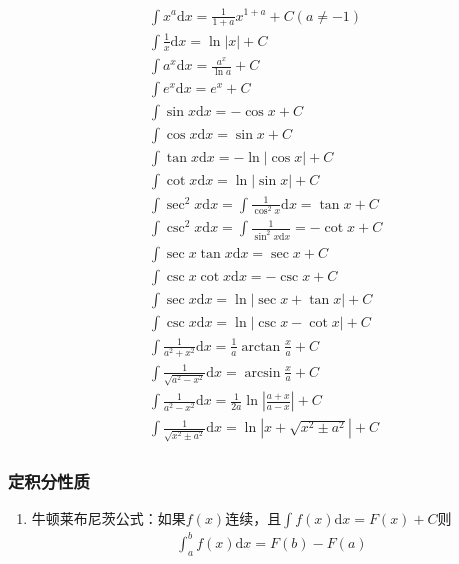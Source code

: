 \documentclass[12pt]{book}
\begin{document}
\begin{gather*}
    \begin{aligned}
        & \int x^{a}\mathrm{d}x =\frac{1}{1+a}x^{1+a}+C (a\neq -1)  \\
        & \int{ \frac{1}{x} \mathrm{d}x} = \ln{|x|} +C \\
        & \int{a^{x}\mathrm{d}x} = \frac{a^x}{\ln{a}}+C \\
        & \int{e^x \mathrm{d}x} = e^x +C \\
        & \int{\sin{x}\mathrm{d}x} = -\cos{x}+C \\
        & \int{\cos{x}\mathrm{d}x} = \sin{x}+C \\
        & \int{\tan{x}\mathrm{d}x} = -\ln{|\cos{x}|}+C \\
        & \int{\cot{x}\mathrm{d}x} = \ln{|\sin{x}|}+C \\
        & \int{\sec^{2}{x}\mathrm{d}x} = \int{\frac{1}{\cos^2{x}}\mathrm{d}x} = \tan{x}+C \\
        & \int{\csc^2{x}\mathrm{d}x} = \int{\frac{1}{\sin^2{x}\mathrm{d}x}=-\cot{x}+C} \\
        & \int{\sec{x}\tan{x}\mathrm{d}x} = \sec{x}+C \\
        & \int{\csc{x}\cot{x}\mathrm{d}x} = -\csc{x}+C \\
        & \int{\sec{x}\mathrm{d}x} = \ln{|\sec{x}+\tan{x}|}+C\\
        & \int{\csc{x}\mathrm{d}x} = \ln{|\csc{x}-\cot{x}|}+C\\
        & \int{\frac{1}{a^2+x^2} \mathrm{d}x} = \frac{1}{a}\arctan{\frac{x}{a}}+C \\
        & \int{\frac{1}{\sqrt{a^2-x^2}}\mathrm{d}x} = \arcsin{\frac{x}{a}}+C \\
        & \int{\frac{1}{a^2-x^2}\mathrm{d}x} = \frac{1}{2a} \ln{\left|\frac{a+x}{a-x}\right|}+C \\
        & \int{\frac{1}{\sqrt{x^2\pm a^2}}\mathrm{d}x} = \ln{\left|x+ \sqrt{x^2\pm a^2}\right|}+C
        \end{aligned}
\end{gather*}







\subsubsection{定积分性质}



\begin{enumerate}[1.]
    \item 牛顿莱布尼茨公式：如果$f(x)$连续，且$\int{f(x)\mathrm{d}x} = F(x)+C$则
          \begin{gather*}
              \int_{a}^{b}{f(x)\mathrm{d}x}=F(b)-F(a)
          \end{gather*}
\end{enumerate}
\end{document}
